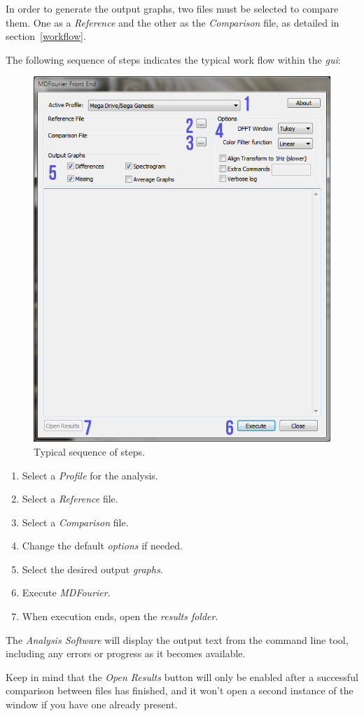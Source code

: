 \documentclass[10pt,a4paper]{report}
\newcommand{\ac}[1]{\textit{\mbox{\acrshort{#1}}}}
\begin{document}
\begin{appendices}
In order to generate the output graphs, two files must be selected to compare them. One as a \textit{Reference} and the other as the \textit{Comparison} file, as detailed in section~\ref{workflow}.

The following sequence of steps indicates the typical work flow within the \ac{gui}:

\begin{figure}[H]
	\centering
	\includegraphics[width=0.6\linewidth]{images/GUI/GUI2.png}
	\caption[Steps]{Typical sequence of steps.}
	\label{fig:gui2}
\end{figure}

\begin{enumerate}
	\item Select a \textit{Profile} for the analysis.
	\item Select a \textit{Reference} file.
	\item Select a \textit{Comparison} file.
	\item Change the default \textit{options} if needed.
	\item Select the desired output \textit{graphs}.
	\item Execute \textit{MDFourier}.
	\item When execution ends, open the \textit{results folder}.
\end{enumerate}

The \textit{Analysis Software} will display the output text from the command line tool, including any errors or progress as it becomes available.

Keep in mind that the \textit{Open Results} button will only be enabled after a successful comparison between files has finished, and it won't open a second instance of the window if you have one already present.


\end{appendices}
\end{document}

